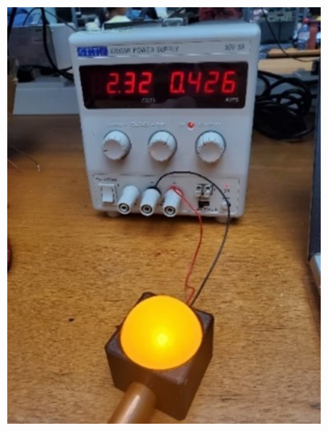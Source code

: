 \begin{figure}
    \centering
    \begin{subfigure}[b]{.45\linewidth}
        \includegraphics[width=\linewidth]{images/led-yellow.jpg}
    \end{subfigure}
    \begin{subfigure}[b]{.45\linewidth}

\end{subfigure}
\end{figure}
